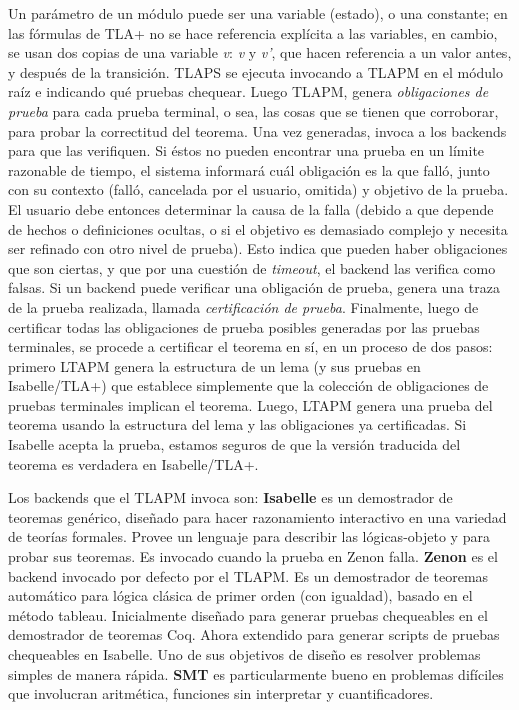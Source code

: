 \documentclass[spanish]{llncs}
\begin{document}
  Un parámetro de un módulo puede ser una variable (estado), o una constante; en las fórmulas de TLA+ no se hace referencia explícita a las variables, en cambio, se usan dos copias de una variable \textit{v}: \textit{v} y \textit{v'}, que hacen referencia a un valor antes, y después de la transición. 
  TLAPS se ejecuta invocando a TLAPM en el módulo raíz e indicando qué pruebas chequear. 
  Luego TLAPM, genera \textit{obligaciones de prueba} para cada prueba terminal, o sea, las cosas que se tienen que corroborar, para probar la correctitud del teorema. Una vez generadas, invoca a los backends para que las verifiquen.
  Si éstos no pueden encontrar una prueba en un límite razonable de tiempo, el sistema informará cuál obligación es la que falló, junto con su contexto (falló, cancelada por el usuario, omitida) y objetivo de la prueba.
  El usuario debe entonces determinar la causa de la falla (debido a que depende de hechos o definiciones ocultas, o si el objetivo es demasiado complejo y necesita ser refinado con otro nivel de prueba). Esto indica que pueden haber obligaciones que son ciertas, y que por una cuestión de \textit{timeout},
  el backend las verifica como falsas.
  Si un backend puede verificar una obligación de prueba, genera una traza de la prueba realizada, llamada \textit{certificación de prueba}.
  Finalmente, luego de certificar todas las obligaciones de prueba posibles generadas por las pruebas
  terminales, se procede a certificar el teorema en sí, en un proceso de dos pasos: primero LTAPM genera la estructura de un lema (y sus pruebas en Isabelle/TLA+) que establece simplemente que la colección de
  obligaciones de pruebas terminales implican el teorema. Luego, LTAPM genera una prueba del teorema usando la estructura del lema y las obligaciones ya certificadas. Si Isabelle acepta la prueba, estamos seguros de que la versión traducida del teorema es verdadera en Isabelle/TLA+.\cite{verifyingsafety}

  Los backends que el TLAPM invoca son: \textbf{Isabelle} es un demostrador de teoremas genérico, diseñado para hacer razonamiento interactivo en una variedad de teorías formales. Provee un lenguaje para describir las lógicas-objeto y para probar sus teoremas. Es invocado cuando la prueba en Zenon falla\cite{verifyingsafety}.
  \textbf{Zenon} es el backend invocado por defecto por el TLAPM. Es un demostrador de teoremas automático para lógica clásica de primer orden (con igualdad), 
  basado en el método tableau. Inicialmente diseñado para generar pruebas chequeables en el demostrador de teoremas Coq. Ahora extendido para generar scripts de pruebas chequeables en Isabelle. Uno de sus objetivos de diseño es resolver problemas simples de manera rápida\cite{zenon}. \textbf{SMT} es particularmente bueno en problemas difíciles que involucran aritmética, funciones sin interpretar y cuantificadores.\cite{formaltech}
\end{document}
